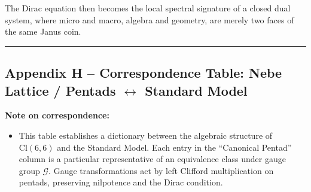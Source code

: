\documentclass[11pt]{article}
\providecommand{\tightlist}{\setlength{\itemsep}{2pt}\setlength{\parskip}{6pt}}
\let\oldmathcal\mathcal
\renewcommand{\mathcal}[1]{\oldmathcal{#1}}
\providecommand{\tightlist}{%
  \setlength{\itemsep}{2pt}\setlength{\parskip}{6pt}
}
\begin{document}
The Dirac equation then becomes the local spectral signature of a closed
dual system, where micro and macro, algebra and geometry, are merely two
faces of the same Janus coin.

\begin{center}\rule{0.5\linewidth}{0.5pt}\end{center}

\hypertarget{appendix-h-correspondence-table-nebe-lattice-pentads-leftrightarrow-standard-model}{%
\subsection{\texorpdfstring{Appendix H -- Correspondence Table: Nebe
Lattice / Pentads \(\leftrightarrow\) Standard
Model}{Appendix H -- Correspondence Table: Nebe Lattice / Pentads \textbackslash leftrightarrow Standard Model}}\label{appendix-h-correspondence-table-nebe-lattice-pentads-leftrightarrow-standard-model}}

\textbf{Note on correspondence:}

\begin{itemize}
\tightlist
\item
  This table establishes a dictionary between the algebraic structure of
  \(\text{Cl}(6,6)\) and the Standard Model. Each entry in the
  ``Canonical Pentad'' column is a particular representative of an
  equivalence class under gauge group \(\mathcal{G}\). Gauge
  transformations act by left Clifford multiplication on pentads,
  preserving nilpotence and the Dirac condition.
\end{itemize}
\end{document}
